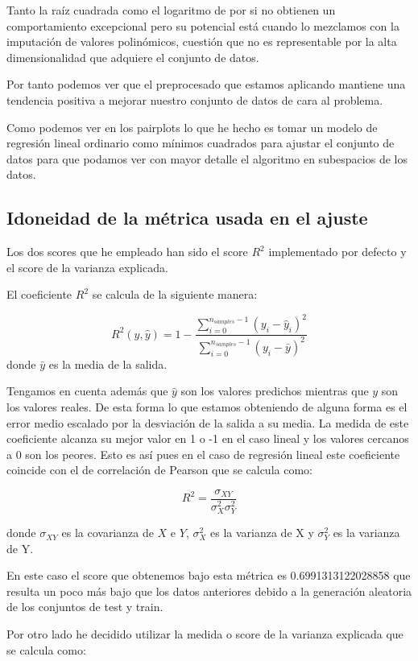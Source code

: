 \documentclass[12pt,a4paper]{article}
\begin{document}
Tanto la raíz cuadrada como el logaritmo de por si no obtienen un comportamiento excepcional pero su potencial está cuando lo mezclamos con la imputación de valores polinómicos, cuestión que no es representable por la alta dimensionalidad que adquiere el conjunto de datos.

Por tanto podemos ver que el preprocesado que estamos aplicando mantiene una tendencia positiva a mejorar nuestro conjunto de datos de cara al problema.

Como podemos ver en los pairplots lo que he hecho es tomar un modelo de regresión lineal ordinario como mínimos cuadrados para ajustar el conjunto de datos para que podamos ver con mayor detalle el algoritmo en subespacios de los datos.

\subsection{Idoneidad de la métrica usada en el ajuste}

Los dos scores que he empleado han sido el score $R^2$ implementado por defecto y el score de la varianza explicada.

El coeficiente $R^2$ se calcula de la siguiente manera:

$$R^2(y,\hat{y}) = 1 - \frac{\sum_{i=0}^{n_{samples}-1} (y_i - \hat{y}_i)^2}{\sum_{i=0}^{n_{samples}-1}(y_i - \bar{y})^2}$$ donde $\bar{y}$ es la media de la salida.

Tengamos en cuenta además que $\hat{y}$ son los valores predichos mientras que $y$ son los valores reales. De esta forma lo que estamos obteniendo de alguna forma es el error medio escalado por la desviación de la salida a su media. La medida de este coeficiente alcanza su mejor valor en 1 o -1 en el caso lineal y los valores cercanos a 0 son los peores. Esto es así pues en el caso de regresión lineal este coeficiente coincide con el de correlación de Pearson que se calcula como:

$$R^2 = \frac{\sigma_{XY}}{\sigma_X^2 \sigma_Y^2}$$

donde $\sigma_{XY}$ es la covarianza de $X$ e $Y$, $\sigma_X^2$ es la varianza de X y $\sigma_Y^2$ es la varianza de Y.

En este caso el score que obtenemos bajo esta métrica es 0.6991313122028858 que resulta un poco más bajo que los datos anteriores debido a la generación aleatoria de los conjuntos de test y train.

Por otro lado he decidido utilizar la medida o score de la varianza explicada que se calcula como:
\end{document}
